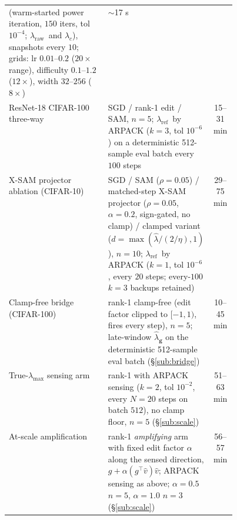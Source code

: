 \documentclass{article}
\theoremstyle{plain}
\theoremstyle{definition}
\theoremstyle{remark}
\newcommand{\lmax}{\lambda_{\max}}
\newcommand{\lraw}{\ensuremath{\lambda_{\mathrm{raw}}}}
\newcommand{\lref}{\ensuremath{\lambda_{\mathrm{ref}}}}
\newcommand{\lhatg}{\hat{\lambda}_{\mathbf{g}}}
\begin{document}
\begin{table}[!ht]
{\begin{tabular}{lp{0.45\linewidth}c}
(warm-started power iteration, $150$ iters, tol $10^{-4}$; \lraw\ and
$\lambda_{c}$), snapshots every $10$; grids: lr $0.01$--$0.2$ ($20\times$
range), difficulty $0.1$--$1.2$ ($12\times$), width $32$--$256$ ($8\times$) &
$\sim$17 s \\
\addlinespace[1.5pt]
ResNet-18 CIFAR-100 three-way & SGD / rank-1 edit / SAM, $n{=}5$; \lref\ by
ARPACK ($k{=}3$, tol $10^{-6}$) on a deterministic 512-sample eval batch
every $100$ steps & 15--31 min \\
\addlinespace[1.5pt]
X-SAM projector ablation (CIFAR-10) & SGD / SAM ($\rho{=}0.05$) / matched-step X-SAM projector
($\rho{=}0.05$, $\alpha{=}0.2$, sign-gated, no clamp) / clamped variant
($d{=}\max(\hat\lambda/(2/\eta),1)$), $n{=}10$; \lref\ by ARPACK ($k{=}1$,
tol $10^{-6}$, every $20$ steps; every-$100$ $k{=}3$ backups retained) &
29--75 min \\
\addlinespace[1.5pt]
Clamp-free bridge (CIFAR-100) & rank-1 clamp-free (edit factor clipped to
$[-1,1)$, fires every step), $n{=}5$; late-window $\lhatg$ on the
deterministic 512-sample eval batch (\S\ref{sub:bridge}) & 10--45 min \\
\addlinespace[1.5pt]
True-$\lmax$ sensing arm & rank-1 with ARPACK sensing ($k{=}2$, tol
$10^{-2}$, every $N{=}20$ steps on batch $512$), no clamp floor, $n{=}5$
(\S\ref{sub:scale}) & 51--63 min \\
\addlinespace[1.5pt]
At-scale amplification & rank-1 \emph{amplifying} arm with fixed edit
factor $\alpha$ along the sensed direction,
$g{+}\alpha(g^{\top}\hat v)\hat v$; ARPACK sensing as above;
$\alpha{=}0.5$ $n{=}5$, $\alpha{=}1.0$ $n{=}3$ (\S\ref{sub:scale}) &
56--57 min \\
\bottomrule
\end{tabular}}
\end{table}
\end{document}

